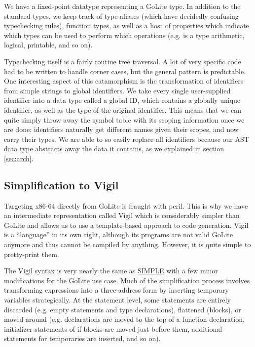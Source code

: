 \documentclass[letterpaper,11pt]{article}
\begin{document}
We have a fixed-point datatype representing a GoLite type. In addition to the standard types, we keep track of type aliases (which have decidedly confusing typechecking rules), function types, as well as a host of properties which indicate which types can be used to perform which operations (e.g. is a type arithmetic, logical, printable, and so on).

Typechecking itself is a fairly routine tree traversal. A lot of very specific code had to be written to handle corner cases, but the general pattern is predictable. One interesting aspect of this catamorphism is the transformation of identifiers from simple strings to global identifiers. We take every single user-supplied identifier into a data type called a global ID, which contains a globally unique identifier, as well as the type of the original identifier. This means that we can quite simply throw away the symbol table with its scoping information once we are done: identifiers naturally get different names given their scopes, and now carry their types. We are able to so easily replace all identifiers because our AST data type abstracts away the data it contains, as we explained in section \ref{sec:arch}.


\subsection{Simplification to Vigil}
\label{sec:ph_simpl}

Targeting x86-64 directly from GoLite is fraught with peril. This is why we have an intermediate representation called Vigil which is considerably simpler than GoLite and allows us to use a template-based approach to code generation. Vigil is a ``language'' in its own right, although its programs are not valid GoLite anymore and thus cannot be compiled by anything. However, it is quite simple to pretty-print them.

The Vigil syntax is very nearly the same as \href{https://web.archive.org/web/20040308142632/http://www-acaps.cs.mcgill.ca/info/McCAT/public/intermediate.html#SIMPLE}{SIMPLE} with a few minor modifications for the GoLite use case. Much of the simplification process involves transforming expressions into a three-address form by inserting temporary variables strategically. At the statement level, some statements are entirely discarded (e.g. empty statements and type declarations), flattened (blocks), or moved around (e.g. declarations are moved to the top of a function declaration, initializer statements of if blocks are moved just before them, additional statements for temporaries are inserted, and so on).
\end{document}
